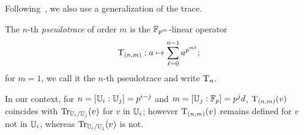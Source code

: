 Following~\cite{vzgathen+shoup92,couveignes00}, we also use a
generalization of the trace.

\begin{definition}[Pseudotrace]
  The $n$-th {\em pseudotrace} of order $m$ is the
  $\mathbb{F}_{p^m}$-linear operator
  \begin{equation*}
    \operatorname{T}_{(n,m)}: a \mapsto \sum_{\ell=0}^{n-1}a^{p^{m\ell}}
    \text{;}
  \end{equation*}
  for $m=1$, we call it the $n$-th pseudotrace and write $\operatorname{T}_n$.
\end{definition}

\begin{nota}
  In our context, for $n=[\mathbb{U}_i:\mathbb{U}_j]=p^{i-j}$ and
  $m=[\mathbb{U}_j:\mathbb{F}_p]=p^jd$, $\operatorname{T}_{(n,m)}(v)$ coincides with
  $\operatorname{Tr}_{\mathbb{U}_{i}/\mathbb{U}_j}(v)$ for $v$ in $\mathbb{U}_i$; however $\operatorname{T}_{(n,m)}(v)$
  remains defined for $v$ not in $\mathbb{U}_i$, whereas
  $\operatorname{Tr}_{\mathbb{U}_{i}/\mathbb{U}_j}(v)$ is not.
\end{nota}


%
